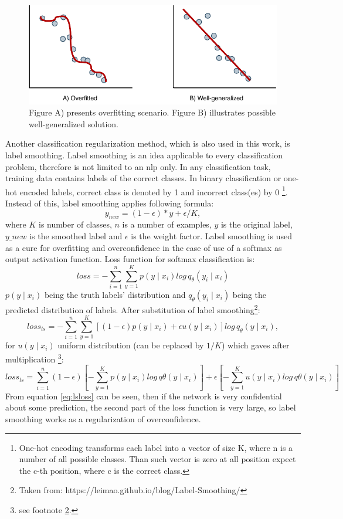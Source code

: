 \begin{figure}[ht]
\centering
\includegraphics[width=0.7\columnwidth]{../img/overfitting}
\caption{Figure A) presents overfitting scenario. Figure B) illustrates possible well-generalized solution. }
\label{pic:overfitting}
\end{figure}
Another classification regularization method, which is also used in this work, is label smoothing. Label smoothing \citep{Szegedy2015} is an idea applicable to every classification problem, therefore is not limited to an \acrshort{nlp} only.
In any classification task, training data contains labels of the correct classes. In binary classification or one-hot encoded labels, correct class is denoted by 1 and incorrect class(es) by 0 \footnote{One-hot encoding transforms each label into a vector of size K, where n is a number of all possible classes. Than such vector is zero at all position expect the c-th position, where c is the correct class.}. Instead of this, label smoothing applies following formula: 
$$y_{new} = (1 - \epsilon) * y + \epsilon / K,$$ where $K$ is number of classes, $n$ is a number of examples, $y$ is the original label, $y\_new$ is the smoothed label and $\epsilon$ is the weight factor. Label smoothing is used as a cure for overfitting and overconfidence in the case of use of a softmax as output activation function. Loss function for softmax classification is: 
 $$ loss = -\sum_{i=1}^{n} \sum_{y=1}^{K} p(y \mid x_i) log \, q_{\theta} ( y_i \mid x_i ) $$
 $p(y \mid x_i)$ being the truth labels' distribution and $q_{\theta} ( y_i \mid x_i )$ being the predicted distribution of labels. After substitution of label smoothing\footnote{\label{note1} Taken from: https://leimao.github.io/blog/Label-Smoothing/}:
$$
loss_{ls} = -\sum_{i=1}^{n} \sum_{y=1}^{K} [(1-\epsilon) p(y \mid x_i)+\epsilon u(y\mid x_i)]log \, q_\theta(y \mid x_i), $$
for $u(y\mid x_i)$ uniform distribution (can be replaced by $1/K$)
which gaves after multiplication \footnote{see footnote \ref{note1}.}:
 \begin{equation} \label{eq:lsloss}
 loss_{ls}= \sum_{i=1}^{n} {(1- \epsilon)[- \sum_{y=1}^{K} p(y\mid x_i) log \, q\theta(y \mid x_i)]+\epsilon [- \sum_{y=1}^{K} u(y \mid x_i)log \, q\theta (y\mid x_i)]}
 \end{equation}
From equation \ref{eq:lsloss} can be seen, then if the network is very confidential about some prediction, the second part of the loss function is very large, so label smoothing works as a regularization of overconfidence.

